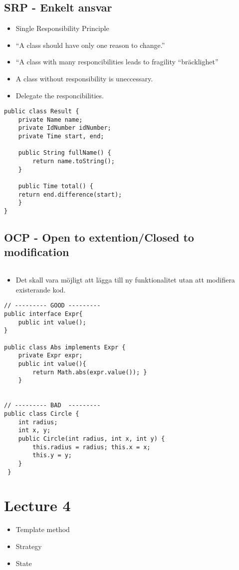 \documentclass[11pt]{amsart}
\begin{document}
\subsection{SRP - Enkelt ansvar}

\begin{itemize}
  \item Single Responsibility Principle
  \item ``A class should have only one reason to change.''
  \item ``A class with many responcibilities leads to fragility ``bräcklighet''
  \item A class without responsibility is uneccessary. 
  \item Delegate the responcibilities.
\end{itemize}

\begin{lstlisting}
public class Result {
	private Name name;
	private IdNumber idNumber; 
	private Time start, end;
	 
	public String fullName() {
		return name.toString(); 
	}
	
	public Time total() {
	return end.difference(start);
	}
}
\end{lstlisting}

\subsection{OCP - Open to extention/Closed to modification}
$ $
\begin{itemize}
  \item Det skall vara möjligt att lägga till ny funktionalitet utan att
  modifiera existerande kod.
\end{itemize}
\begin{lstlisting}
// --------- GOOD ---------
public interface Expr{
	public int value();
}

public class Abs implements Expr { 
	private Expr expr;
	public int value(){
  		return Math.abs(expr.value()); }
	}


// --------- BAD  ---------
public class Circle { 
	int radius;
	int x, y;
	public Circle(int radius, int x, int y) {
		this.radius = radius; this.x = x;
		this.y = y;
	}
 }
\end{lstlisting}

\section{Lecture 4}

\begin{itemize}
\item Template method
\item Strategy
\item State
\end{itemize}
\end{document}
